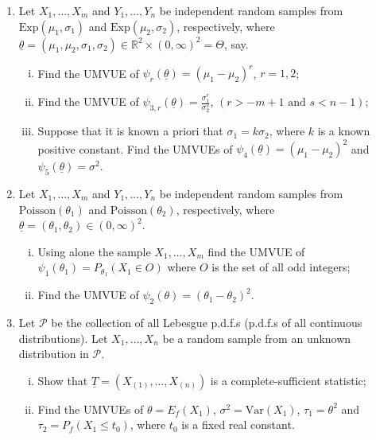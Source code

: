 \documentclass[12pt]{article}
\begin{document}
\begin{enumerate}
    \item Let $X_{1}, \dots, X_{m}$ and $Y_{1}, \dots, Y_{n}$ be independent random samples from $\text{Exp}(\mu_{1}, \sigma_{1})$ and $\text{Exp}(\mu_{2}, \sigma_{2})$, respectively, where $\underline{\theta} = (\mu_{1}, \mu_{2}, \sigma_{1}, \sigma_{2}) \in \mathbb{R}^{2} \times (0, \infty)^{2} = \Theta$, say.
    \begin{enumerate}[(i)]
        \item Find the UMVUE of $\psi_{r}(\underline{\theta}) = (\mu_{1} - \mu_{2})^{r}$, $r = 1, 2$;
        \item Find the UMVUE of $\psi_{3,r}(\underline{\theta}) = \frac{\sigma_{1}^{r}}{\sigma_{2}^{s}}$, $(r > -m+1 \text{ and } s < n-1)$;
        \item Suppose that it is known a priori that $\sigma_{1} = k\sigma_{2}$, where $k$ is a known positive constant. Find the UMVUEs of $\psi_{4}(\underline{\theta}) = (\mu_{1} - \mu_{2})^{2}$ and $\psi_{5}(\underline{\theta}) = \sigma^{2}$.
    \end{enumerate}

    \item Let $X_{1}, \dots, X_{m}$ and $Y_{1}, \dots, Y_{n}$ be independent random samples from $\text{Poisson}(\theta_{1})$ and $\text{Poisson}(\theta_{2})$, respectively, where $\underline{\theta} = (\theta_{1}, \theta_{2}) \in (0, \infty)^{2}$.
    \begin{enumerate}[(i)]
        \item Using alone the sample $X_{1}, \dots, X_{m}$ find the UMVUE of $\psi_{1}(\theta_{1}) = P_{\theta_{1}}(X_{1} \in O)$ where $O$ is the set of all odd integers;
        \item Find the UMVUE of $\psi_{2}(\theta) = (\theta_{1} - \theta_{2})^{2}$.
    \end{enumerate}

    \item Let $\mathcal{P}$ be the collection of all Lebesgue p.d.f.s (p.d.f.s of all continuous distributions). Let $X_{1}, \dots, X_{n}$ be a random sample from an unknown distribution in $\mathcal{P}$.
    \begin{enumerate}[(i)]
        \item Show that $\underline{T} = (X_{(1)}, \dots, X_{(n)})$ is a complete-sufficient statistic;
        \item Find the UMVUEs of $\theta = E_{f}(X_{1})$, $\sigma^{2} = \text{Var}(X_{1})$, $\tau_{1} = \theta^{2}$ and $\tau_{2} = P_{f}(X_{1} \le t_{0})$, where $t_{0}$ is a fixed real constant.
    \end{enumerate}


\end{enumerate}
\end{document}
